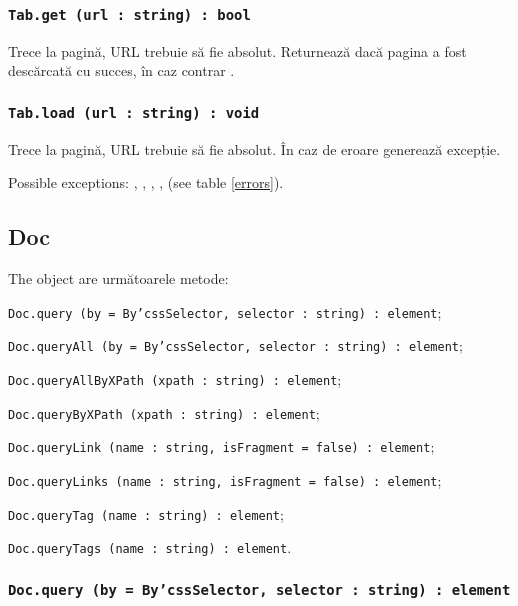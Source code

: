 \subsubsection{\texttt{Tab.get (url : string) : bool}}

Trece la pagină, URL trebuie să fie absolut. Returnează \true{} dacă pagina a fost descărcată cu succes, în caz contrar \false.

\subsubsection{\texttt{Tab.load (url : string) : void}}

Trece la pagină, URL trebuie să fie absolut. În caz de eroare generează excepție.

Possible exceptions: , , , ,  (see table \ref{errors}).

\subsection{{\color{orange} Doc}}

The object \dom{} are următoarele metode:
\begin{icItems}
	\item \texttt{Doc.query (by = By'cssSelector, selector : string) : element};
	\item \texttt{Doc.queryAll (by = By'cssSelector, selector : string) : element};
	\item \texttt{Doc.queryAllByXPath (xpath : string) : element};
	\item \texttt{Doc.queryByXPath (xpath : string) : element};
	\item \texttt{Doc.queryLink (name : string, isFragment = false) : element};
	\item \texttt{Doc.queryLinks (name : string, isFragment = false) : element};
	\item \texttt{Doc.queryTag (name : string) : element};
	\item \texttt{Doc.queryTags (name : string) : element}.
\end{icItems}

\subsubsection{\texttt{Doc.query (by = By'cssSelector, selector : string) : element}}

